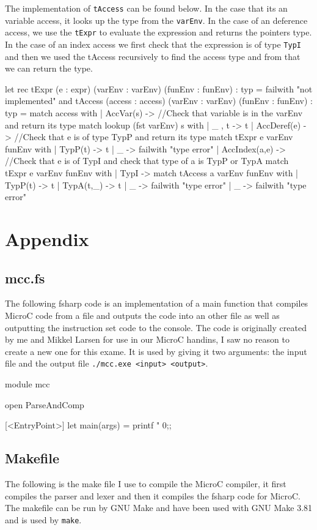 The implementation of \texttt{tAccess} can be found below. In the case that its
an variable access, it looks up the type from the \texttt{varEnv}. In the case
of an deference access, we use the \texttt{tExpr} to evaluate the expression and returns
the pointers type. In the case of an index access we first check that the
expression is of type \texttt{TypI} and then we used the tAccess recursively to
find the access type and from that we can return the type.
\begin{fs}
let rec tExpr (e : expr) (varEnv : varEnv) (funEnv : funEnv) : typ =
    failwith "not implemented"
and tAccess (access : access) (varEnv : varEnv) (funEnv : funEnv) : typ =
    match access with
    | AccVar(s) -> 
      //Check that variable is in the varEnv and return its type
      match lookup (fst varEnv) s with
      | _ , t -> t
    | AccDeref(e) -> 
      //Check that e is of type TypP and return its type
      match tExpr e varEnv funEnv with
      | TypP(t) -> t
      | _ -> failwith "type error"
    | AccIndex(a,e) -> 
      //Check that e is of TypI and check that type of a is TypP or TypA
      match tExpr e varEnv funEnv with
      | TypI -> 
        match tAccess a varEnv funEnv with
        | TypP(t) -> t
        | TypA(t,_) -> t
        | _ -> failwith "type error"
      | _ -> failwith "type error"
\end{fs}

\pagebreak
\section{Appendix}
\subsection{mcc.fs}
The following fsharp code is an implementation of a main function that compiles
MicroC code from a file and outputs the code into an other file as well as
outputting the instruction set code to the console. The code is originally
created by me and Mikkel Larsen for use in our MicroC handins, I saw no reason
to create a new one for this exame. It is used by giving it two arguments: the
input file and the output file \texttt{./mcc.exe <input> <output>}. 
\begin{fs}
module mcc

open ParseAndComp

[<EntryPoint>]
let main(args) =
    printf "%
    0;;
\end{fs}
\subsection{Makefile}
The following is the make file I use to compile the MicroC compiler, it first
compiles the parser and lexer and then it compiles the fsharp code for MicroC.
The makefile can be run by GNU Make and have been used with GNU Make 3.81 and is
used by \texttt{make}.

